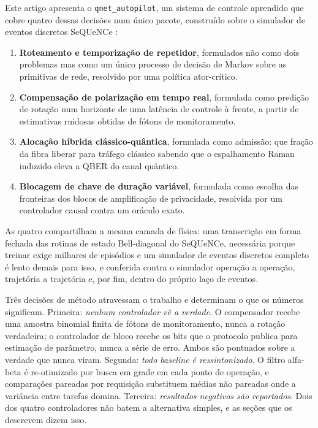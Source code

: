 \documentclass[12pt]{article}
\begin{document}
Este artigo apresenta o \texttt{qnet\_autopilot}, um sistema de controle
aprendido que cobre quatro dessas decisões num único pacote, construído sobre o
simulador de eventos discretos SeQUeNCe \cite{wu2021}:

\begin{enumerate}
\item \textbf{Roteamento e temporização de repetidor}, formulados não como dois
  problemas mas como um único processo de decisão de Markov sobre as primitivas
  de rede, resolvido por uma política ator-crítico.
\item \textbf{Compensação de polarização em tempo real}, formulada como
  predição de rotação num horizonte de uma latência de controle à frente, a
  partir de estimativas ruidosas obtidas de fótons de monitoramento.
\item \textbf{Alocação híbrida clássico-quântica}, formulada como admissão: que
  fração da fibra liberar para tráfego clássico sabendo que o espalhamento
  Raman induzido eleva a QBER do canal quântico.
\item \textbf{Blocagem de chave de duração variável}, formulada como escolha
  das fronteiras dos blocos de amplificação de privacidade, resolvida por um
  controlador causal contra um oráculo exato.
\end{enumerate}

As quatro compartilham a mesma camada de física: uma transcrição em forma
fechada das rotinas de estado Bell-diagonal do SeQUeNCe, necessária porque
treinar exige milhares de episódios e um simulador de eventos discretos completo
é lento demais para isso, e conferida contra o simulador operação a operação,
trajetória a trajetória e, por fim, dentro do próprio laço de eventos.

Três decisões de método atravessam o trabalho e determinam o que os números
significam. Primeira: \emph{nenhum controlador vê a verdade}. O compensador
recebe uma amostra binomial finita de fótons de monitoramento, nunca a rotação
verdadeira; o controlador de bloco recebe os bits que o protocolo publica para
estimação de parâmetro, nunca a série de erro. Ambos são pontuados sobre a
verdade que nunca viram. Segunda: \emph{todo baseline é ressintonizado}. O
filtro alfa-beta é re-otimizado por busca em grade em cada ponto de operação, e
comparações pareadas por requisição substituem médias não pareadas onde a
variância entre tarefas domina. Terceira: \emph{resultados negativos são
reportados}. Dois dos quatro controladores não batem a alternativa simples, e
as seções que os descrevem dizem isso.
\end{document}
